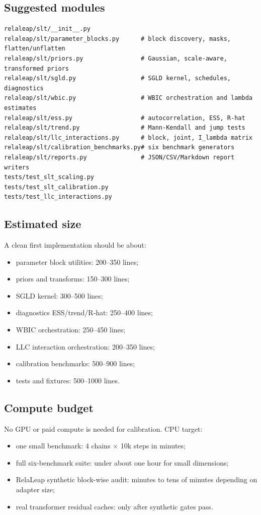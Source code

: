 \documentclass[11pt]{article}
\begin{document}
\subsection{Suggested modules}

\begin{verbatim}
relaleap/slt/__init__.py
relaleap/slt/parameter_blocks.py      # block discovery, masks, flatten/unflatten
relaleap/slt/priors.py                # Gaussian, scale-aware, transformed priors
relaleap/slt/sgld.py                  # SGLD kernel, schedules, diagnostics
relaleap/slt/wbic.py                  # WBIC orchestration and lambda estimates
relaleap/slt/ess.py                   # autocorrelation, ESS, R-hat
relaleap/slt/trend.py                 # Mann-Kendall and jump tests
relaleap/slt/llc_interactions.py      # block, joint, I_lambda matrix
relaleap/slt/calibration_benchmarks.py# six benchmark generators
relaleap/slt/reports.py               # JSON/CSV/Markdown report writers
tests/test_slt_scaling.py
tests/test_slt_calibration.py
tests/test_llc_interactions.py
\end{verbatim}

\subsection{Estimated size}

A clean first implementation should be about:
\begin{itemize}
\item parameter block utilities: 200--350 lines;
\item priors and transforms: 150--300 lines;
\item SGLD kernel: 300--500 lines;
\item diagnostics ESS/trend/R-hat: 250--400 lines;
\item WBIC orchestration: 250--450 lines;
\item LLC interaction orchestration: 200--350 lines;
\item calibration benchmarks: 500--900 lines;
\item tests and fixtures: 500--1000 lines.
\end{itemize}

\subsection{Compute budget}

No GPU or paid compute is needed for calibration.  CPU target:
\begin{itemize}
\item one small benchmark: 4 chains $\times$ 10k steps in minutes;
\item full six-benchmark suite: under about one hour for small dimensions;
\item RelaLeap synthetic block-wise audit: minutes to tens of minutes depending on adapter size;
\item real transformer residual caches: only after synthetic gates pass.
\end{itemize}
\end{document}
